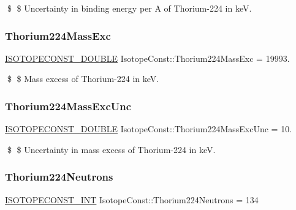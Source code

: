 \$ \$ Uncertainty in binding energy per A of Thorium-\/224 in keV. \mbox{\label{group___isotope_const-_thorium-_th224_gae2270309f23b207e274ff69a0dbd9127}} 
\subsubsection{\texorpdfstring{Thorium224\+Mass\+Exc}{Thorium224MassExc}}
{\footnotesize\ttfamily \mbox{\hyperlink{group___isotope_const-_macros_ga8f45a7272ce02c0b4c65c44636ed719a}{I\+S\+O\+T\+O\+P\+E\+C\+O\+N\+S\+T\+\_\+\+D\+O\+U\+B\+LE}} Isotope\+Const\+::\+Thorium224\+Mass\+Exc = 19993.}

\$ \$ Mass excess of Thorium-\/224 in keV. \mbox{\label{group___isotope_const-_thorium-_th224_ga78d1a85ad20ea9a08fb0b904ee1464ea}} 
\subsubsection{\texorpdfstring{Thorium224\+Mass\+Exc\+Unc}{Thorium224MassExcUnc}}
{\footnotesize\ttfamily \mbox{\hyperlink{group___isotope_const-_macros_ga8f45a7272ce02c0b4c65c44636ed719a}{I\+S\+O\+T\+O\+P\+E\+C\+O\+N\+S\+T\+\_\+\+D\+O\+U\+B\+LE}} Isotope\+Const\+::\+Thorium224\+Mass\+Exc\+Unc = 10.}

\$ \$ Uncertainty in mass excess of Thorium-\/224 in keV. \mbox{\label{group___isotope_const-_thorium-_th224_ga548e51d40c19c206066aea992b853010}} 
\subsubsection{\texorpdfstring{Thorium224\+Neutrons}{Thorium224Neutrons}}
{\footnotesize\ttfamily \mbox{\hyperlink{group___isotope_const-_macros_ga5f18360b3e99483a35c32d789e62621c}{I\+S\+O\+T\+O\+P\+E\+C\+O\+N\+S\+T\+\_\+\+I\+NT}} Isotope\+Const\+::\+Thorium224\+Neutrons = 134}

